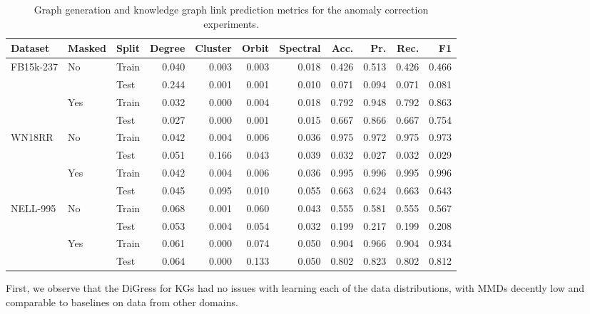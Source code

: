 \begin{table}[H]
    \centering
    \caption{Graph generation and knowledge graph link prediction metrics for the anomaly correction experiments.}
    \label{tab:kg_diffusion_metrics}
    \begin{adjustbox}{width=\textwidth}
    \begin{tabular}{lll|rrrr|rrrr}
    \toprule
         Dataset & Masked & Split & Degree & Cluster & Orbit & Spectral & Acc. & Pr. & Rec. & F1  \\
    \midrule
         \multirow{4}{*}{FB15k-237} & \multirow{2}{*}{No} & Train & 0.040 & 0.003 & 0.003 & 0.018 & 0.426 & 0.513 & 0.426 & 0.466 \\
         & & Test & 0.244 & 0.001 & 0.001 & 0.010 & 0.071 & 0.094 & 0.071 & 0.081 \\ 
         & \multirow{2}{*}{Yes} & Train & 0.032 & 0.000 & 0.004 & 0.018 & 0.792 & 0.948 & 0.792 & 0.863 \\ 
         & & Test & 0.027 & 0.000 & 0.001 & 0.015 & 0.667 & 0.866 & 0.667 & 0.754 \\ 
         \midrule  
         \multirow{4}{*}{WN18RR} & \multirow{2}{*}{No} & Train & 0.042 & 0.004 & 0.006 & 0.036 & 0.975 & 0.972 & 0.975 & 0.973 \\
         & & Test & 0.051 & 0.166 & 0.043 & 0.039 & 0.032 & 0.027 & 0.032 & 0.029 \\ 
         & \multirow{2}{*}{Yes} & Train & 0.042 & 0.004 & 0.006 & 0.036 & 0.995 & 0.996 & 0.995 & 0.996 \\ 
         & & Test & 0.045 & 0.095 & 0.010 & 0.055 & 0.663 & 0.624 & 0.663 & 0.643 \\ 
         \midrule
         \multirow{4}{*}{NELL-995} & \multirow{2}{*}{No} & Train & 0.068 & 0.001 & 0.060 & 0.043 & 0.555 & 0.581 & 0.555 & 0.567 \\
         & & Test & 0.053 & 0.004 & 0.054 & 0.032 & 0.199 & 0.217 & 0.199 & 0.208 \\ 
         & \multirow{2}{*}{Yes} & Train & 0.061 & 0.000 & 0.074 & 0.050 & 0.904 & 0.966 & 0.904 & 0.934 \\ 
         & & Test & 0.064 & 0.000 & 0.133 & 0.050 & 0.802 & 0.823 & 0.802 & 0.812 \\ 
    \bottomrule
    \end{tabular}
    \end{adjustbox}
\end{table}

First, we observe that the DiGress for KGs had no issues with learning each of the data distributions, with MMDs decently low and comparable to baselines on data from other domains. 

